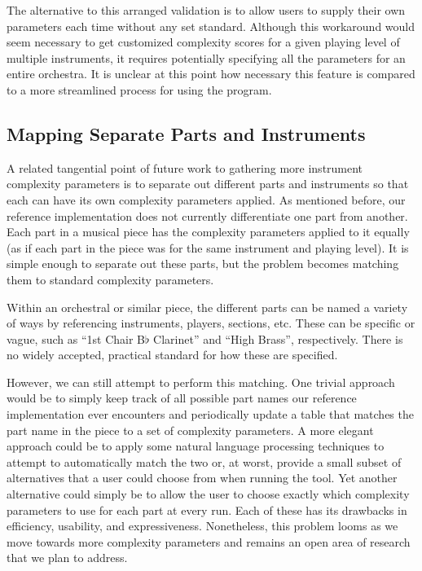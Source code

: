 \documentclass[10pt,preprint]{sigplanconf}
\begin{document}
The alternative to this arranged validation is to allow users to supply their own parameters each time without any set standard. Although this workaround would seem necessary to get customized complexity scores for a given playing level of multiple instruments, it requires potentially specifying all the parameters for an entire orchestra. It is unclear at this point how necessary this feature is compared to a more streamlined process for using the program.

\subsection{Mapping Separate Parts and Instruments}
\label{sec:partinstruments}

A related tangential point of future work to gathering more instrument complexity parameters is to separate out different parts and instruments so that each can have its own complexity parameters applied. As mentioned before, our reference implementation does not currently differentiate one part from another. Each part in a musical piece has the complexity parameters applied to it equally (as if each part in the piece was for the same instrument and playing level). It is simple enough to separate out these parts, but the problem becomes matching them to standard complexity parameters.

Within an orchestral or similar piece, the different parts can be named a variety of ways by referencing instruments, players, sections, etc. These can be specific or vague, such as ``1st Chair B$\flat$ Clarinet'' and ``High Brass'', respectively. There is no widely accepted, practical standard for how these are specified.

However, we can still attempt to perform this matching. One trivial approach would be to simply keep track of all possible part names our reference implementation ever encounters and periodically update a table that matches the part name in the piece to a set of complexity parameters. A more elegant approach could be to apply some natural language processing techniques to attempt to automatically match the two or, at worst, provide a small subset of alternatives that a user could choose from when running the tool. Yet another alternative could simply be to allow the user to choose exactly which complexity parameters to use for each part at every run. Each of these has its drawbacks in efficiency, usability, and expressiveness. Nonetheless, this problem looms as we move towards more complexity parameters and remains an open area of research that we plan to address.
\end{document}
